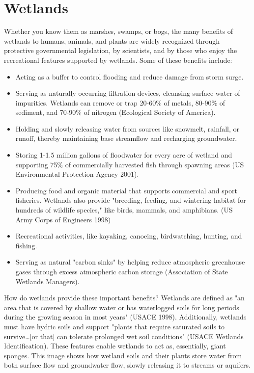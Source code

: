 \chapter{Wetlands}\label{subsec:wetland}
Whether you know them as marshes, swamps, or bogs, the many benefits of 
wetlands to humans, animals, and plants are widely recognized through 
protective governmental legislation, by scientists, and by those who enjoy the 
recreational features supported by wetlands. Some of these benefits include:
\begin{itemize}
    \item Acting as a buffer to control flooding and reduce damage from storm 
    surge.
    \item Serving as naturally-occurring filtration devices, cleansing surface 
    water of impurities.  Wetlands can remove or trap 20-60\% of metals, 80-90\% 
    of sediment, and 70-90\% of nitrogen (Ecological Society of America).
    \item Holding and slowly releasing water from sources like snowmelt, 
    rainfall, or runoff, thereby maintaining base streamflow and recharging 
    groundwater.
    \item Storing 1-1.5 million gallons of floodwater for every acre of wetland
    and supporting 75\% of commercially harvested fish through spawning areas 
    (US Environmental Protection Agency 2001).
    \item Producing food and organic material that supports commercial and 
    sport fisheries. Wetlands also provide "breeding, feeding, and wintering 
    habitat for hundreds of wildlife species," like birds, mammals, and 
    amphibians. (US Army Corps of Engineers 1998)
    \item Recreational activities, like kayaking, canoeing, birdwatching, 
    hunting, and fishing.
    \item Serving as natural "carbon sinks" by helping reduce atmospheric
    greenhouse gases through excess atmospheric carbon storage (Association 
    of State Wetlands Managers).
\end{itemize}

How do wetlands provide these important benefits? Wetlands are defined as "an 
area that is covered by shallow water or has waterlogged soils for long periods 
during the growing season in most years" (USACE 1998). Additionally, wetlands 
must have hydric soils and support "plants that require saturated soils to 
survive\ldots [or that] can tolerate prolonged wet soil conditions" (USACE 
Wetlands Identification). These features enable wetlands to act as, 
essentially, giant sponges. This image shows how wetland soils and their plants 
store water from both surface flow and groundwater flow, slowly releasing it to 
streams or aquifers.

